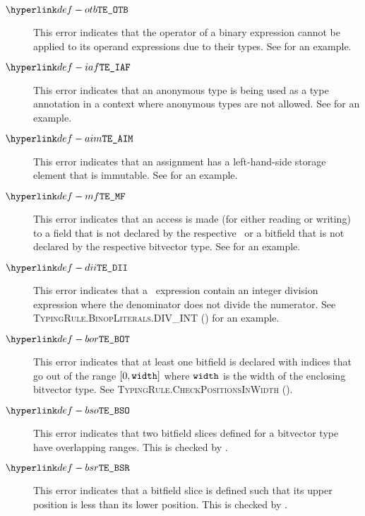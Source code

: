 \begin{description}
\hypertarget{def-otb}{}
\item[$\InvalidOperandTypesForBinop$]
This error indicates that the operator of a binary expression cannot be applied to its operand expressions
due to their types.
See  for an example.

\hypertarget{def-iaf}{}
\item[$\AnnonymousFormNotAllowedHere$]
This error indicates that an anonymous type is being used as a type annotation in a context
where anonymous types are not allowed.
See  for an example.

\hypertarget{def-aim}{}
\item[$\AssignmentToImmutable$]
This error indicates that an assignment has a left-hand-side storage element that is immutable.
See  for an example.

\hypertarget{def-mf}{}
\item[$\MissingField$]
This error indicates that an access is made (for either reading or writing) to a field that is
not declared by the respective \structuredtype\ or a bitfield that is not declared by the respective
bitvector type.
See  for an example.

\hypertarget{def-dii}{}
\item[$\DivIntIndivisible$]
This error indicates that a \staticallyevaluable\ expression contain an integer division expression where
the denominator does not divide the numerator.
See \textsc{TypingRule.BinopLiterals.DIV\_INT} () for an example.

\hypertarget{def-bor}{}
\item[$\BitfieldsOutOfRange$]
This error indicates that at least one bitfield is declared with indices that go out of the range
$[0, \texttt{width}]$ where $\texttt{width}$ is the width of the enclosing bitvector type.
See \textsc{TypingRule.CheckPositionsInWidth} ().

\hypertarget{def-bso}{}
\item[$\BitfieldSlicesOverlap$]
This error indicates that two bitfield slices defined for a bitvector type have overlapping ranges.
This is checked by .

\hypertarget{def-bsr}{}
\item[$\BitfieldSliceReversed$]
This error indicates that a bitfield slice is defined such that its upper position is less than its lower position.
This is checked by .


\end{description}
